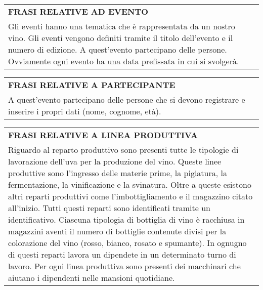 \begin{center}
	\vspace{0.5cm}
	
	\begin{tabular}{P{16cm}}
		\toprule
		 \textbf {\large {FRASI RELATIVE AD EVENTO}} \\
		Gli eventi hanno una tematica che è rappresentata da un nostro vino. Gli eventi vengono definiti tramite il titolo dell'evento e il numero di edizione. A quest'evento partecipano delle persone. Ovviamente ogni evento ha una data prefissata in cui si svolgerà.\\
		\bottomrule
	\end{tabular}
	
	\vspace{0.5cm}
	
	\begin{tabular}{P{16cm}}
		\toprule
		 \textbf {\large {FRASI RELATIVE A PARTECIPANTE}} \\
		A quest'evento partecipano delle persone che si devono registrare e inserire i propri dati (nome, cognome, età).\\
		\bottomrule
	\end{tabular}
	
	\vspace{0.5cm}
	
	\begin{tabular}{P{16cm}}
		\toprule
		 \textbf {\large {FRASI RELATIVE A LINEA PRODUTTIVA}} \\
		Riguardo al reparto produttivo sono presenti tutte le tipologie di lavorazione dell'uva per la produzione del vino. Queste linee produttive sono l'ingresso delle materie prime, la pigiatura, la fermentazione, la vinificazione e la svinatura. Oltre a queste esistono altri reparti produttivi come l'imbottigliamento e il magazzino citato all'inizio. Tutti questi reparti sono identificati tramite un identificativo. Ciascuna tipologia di bottiglia di vino è racchiusa in magazzini aventi il numero di bottiglie contenute divisi per la colorazione del vino (rosso, bianco, rosato e spumante). In ognugno di questi reparti lavora un dipendete in un determinato turno di lavoro. Per ogni linea produttiva sono presenti dei macchinari che aiutano i dipendenti nelle mansioni quotidiane.\\
		\bottomrule
	\end{tabular}
	
	\vspace{0.5cm}
	

\end{center}
